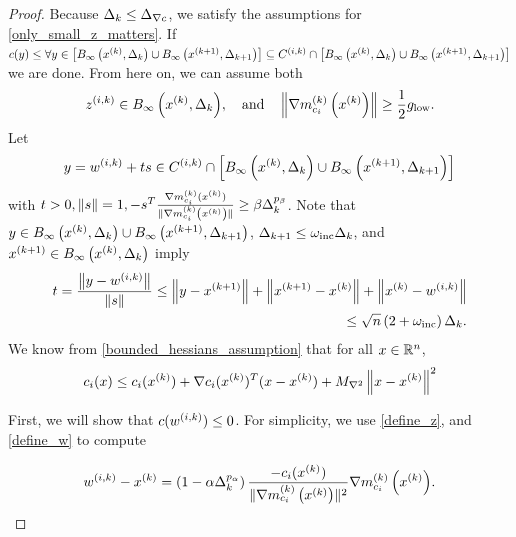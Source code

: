 \begin{proof}
Because $\dk \le \mingraddelta$, we satisfy the assumptions for \cref{only_small_z_matters}.
If $c(y) \le \forall y \in \left[\tr \cup \trkpo\right] \subseteq \fik \cap \left[\tr \cup \trkpo\right]$ we are done.
From here on, we can assume both
\begin{align}
\zik \in \tr, \quad \textrm{and} \quad \left\|\gmcik\right\| \ge \frac 1 2 \mingrad. \label{z_is_active}
\end{align}
Let
\begin{align}
y = \wik + ts \in \fik \cap \left[\tr \cup \trkpo\right] \label{t_is_bounded}
\end{align}
with $t > 0, \|s\| = 1, -s^T\hgik \ge \beta \dk^{p_{\beta}}$.
Note that $y \in \tr \cup \trkpo$, $\dkpo \le \omegainc\dk$, and $\xkpo \in \tr$ imply
\begin{align}
\label{eccif_bound_t}
t = \frac{\left\|y - \wik\right\|}{\left\|s\right\|} 
\le \left\|y - \xkpo\right\| + \left\|\xkpo - \xk\right\| + \left\|\xk - \wik\right\| \\
\le \sqrt{n}\left(2 + \omegainc \right)\dk.
\end{align}
We know from \cref{bounded_hessians_assumption} that for all $x \in \Rn$,
\begin{align}
c_i(x) \le c_i(\xk) + \nabla c_i(\xk)^T(x - \xk) + \maxhessian \left \|x - \xk \right\|^2 \label{constraint_lower_bound}
\end{align}

First, we will show that $c(\wik) \le 0$.
For simplicity, we use \cref{define_z}, and \cref{define_w} to compute


\begin{align}
\wik - \xk = \left(1 - \alpha \dk^{p_{\alpha} }\right)\frac{-c_i(\xk)}{\|\gmcik\|^2}\gmcik. \label{simple_computation}
\end{align}


\end{proof}
